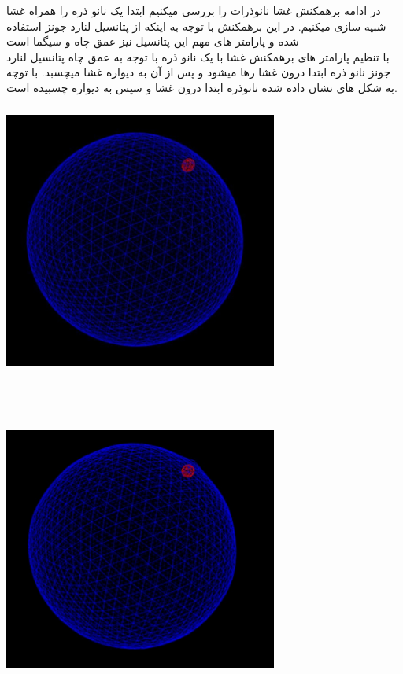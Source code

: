 \documentclass[12pt,onecolumn,a4paper]{report}
\begin{document}
در ادامه برهمکنش غشا نانوذرات را   بررسی میکنیم
ابتدا یک نانو ذره را همراه غشا شبیه سازی میکنیم.
در این برهمکنش با توجه به اینکه از پتانسیل لنارد جونز استفاده شده و پارامتر های مهم این پتانسیل نیز عمق چاه و سیگما است \\
با تنظیم پارامتر های برهمکنش غشا با یک نانو ذره با توجه به عمق چاه پتانسیل لنارد جونز نانو ذره ابتدا درون غشا رها میشود و پس از آن به دیواره غشا میچسبد.
با توچه به شکل های نشان داده شده نانوذره ابتدا درون غشا و سپس به دیواره چسبیده است.
\begin{center}
\includegraphics[width=9cm, height=9cm]{20210214_160511.jpg}
\end{center}\\
\begin{center}
\includegraphics[width=9cm, height=9cm]{20210214_160439.jpg}
\end{center}\\
\end{document}
